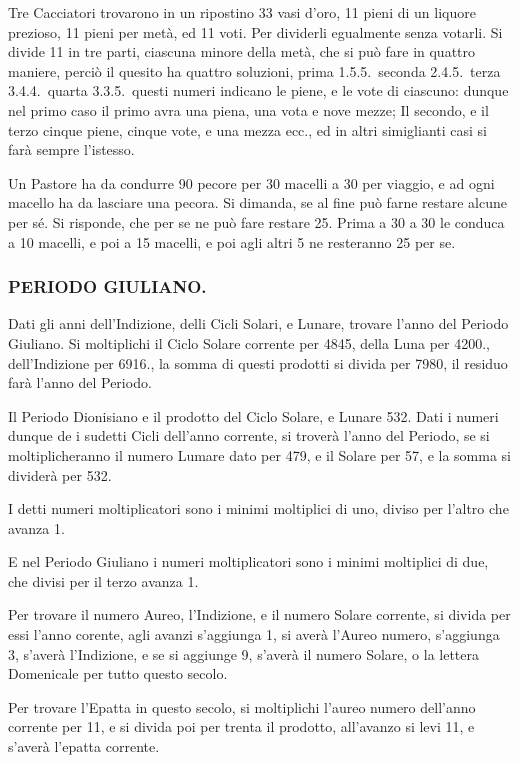 \documentclass[11pt,a6paper]{article}
\begin{document}
Tre Cacciatori trovarono in un ripostino 33
vasi d'oro, 11 pieni di un liquore prezioso, 11
pieni per metà, ed 11 voti. Per dividerli egualmente
senza votarli. Si divide 11 in tre parti, ciascuna minore
della metà, che si può fare in quattro maniere,
perciò il quesito ha quattro soluzioni, prima 1.5.5.\
seconda 2.4.5.\ terza 3.4.4.\ quarta 3.3.5.\ questi
numeri indicano le piene, e le vote di ciascuno:
dunque nel primo caso il primo avra una piena, una
vota e nove mezze; Il secondo, e il terzo cinque
piene, cinque vote, e una mezza ecc., ed in altri
simiglianti casi si farà sempre l'istesso.

Un Pastore ha da condurre 90 pecore per 30
macelli a 30 per viaggio, e ad ogni macello ha da
lasciare una pecora. Si dimanda, se al fine può farne
restare alcune per sé. Si risponde, che per se ne
può fare restare 25. Prima a 30 a 30 le conduca a 10
macelli, e poi a 15 macelli, e poi agli altri 5 ne
resteranno 25 per se.

\subsubsection{PERIODO GIULIANO.}

Dati gli anni dell'Indizione, delli Cicli Solari,
e Lunare, trovare l'anno del Periodo Giuliano.
Si moltiplichi il Ciclo Solare corrente per 4845,
della Luna per 4200., dell'Indizione per 6916., la
somma di questi prodotti si divida per 7980, il
residuo farà l'anno del Periodo.

Il Periodo Dionisiano e il prodotto del Ciclo
Solare, e Lunare 532. Dati i numeri dunque de i
sudetti Cicli dell'anno corrente, si troverà l'anno
del Periodo, se si moltiplicheranno il numero
Lumare dato per 479, e il Solare per 57, e la somma si
dividerà per 532.

I detti numeri moltiplicatori sono i minimi
moltiplici di uno, diviso per l'altro che avanza 1.

E nel Periodo Giuliano i numeri moltiplicatori
sono i minimi moltiplici di due, che divisi per il
terzo avanza 1.

Per trovare il numero Aureo, l'Indizione, e il
numero Solare corrente, si divida per essi l'anno
corente, agli avanzi s'aggiunga 1, si averà l'Aureo
numero, s'aggiunga 3, s'averà l'Indizione, e se si
aggiunge 9, s'averà il numero Solare, o la lettera
Domenicale per tutto questo secolo.

Per trovare l'Epatta in questo secolo, si moltiplichi
l'aureo numero dell'anno corrente per 11, e
si divida poi per trenta il prodotto, all'avanzo si levi
11, e s'averà l'epatta corrente.
\end{document}
